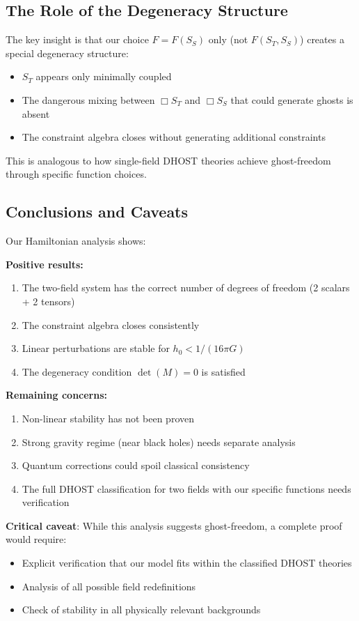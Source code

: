 \documentclass[12pt]{article}
\begin{document}
\subsection{The Role of the Degeneracy Structure}

The key insight is that our choice $F=F(S_S)$ only (not $F(S_T, S_S)$) creates a special degeneracy structure:
\begin{itemize}
    \item $S_T$ appears only minimally coupled
    \item The dangerous mixing between $\Box S_T$ and $\Box S_S$ that could generate ghosts is absent
    \item The constraint algebra closes without generating additional constraints
\end{itemize}
This is analogous to how single-field DHOST theories achieve ghost-freedom through specific function choices.

\subsection{Conclusions and Caveats}

Our Hamiltonian analysis shows:

\textbf{Positive results:}
\begin{enumerate}
    \item The two-field system has the correct number of degrees of freedom (2 scalars + 2 tensors)
    \item The constraint algebra closes consistently
    \item Linear perturbations are stable for $h_0 < 1/(16\pi G)$
    \item The degeneracy condition $\det(M)=0$ is satisfied
\end{enumerate}

\textbf{Remaining concerns:}
\begin{enumerate}
    \item Non-linear stability has not been proven
    \item Strong gravity regime (near black holes) needs separate analysis
    \item Quantum corrections could spoil classical consistency
    \item The full DHOST classification for two fields with our specific functions needs verification
\end{enumerate}

\textbf{Critical caveat}: While this analysis suggests ghost-freedom, a complete proof would require:
\begin{itemize}
    \item Explicit verification that our model fits within the classified DHOST theories
    \item Analysis of all possible field redefinitions
    \item Check of stability in all physically relevant backgrounds
\end{itemize}
\end{document}
